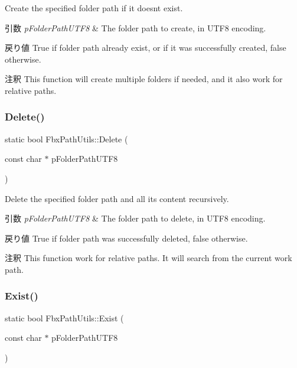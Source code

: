 Create the specified folder path if it doesn\textquotesingle{}t exist. 
\begin{DoxyParams}{引数}
{\em p\+Folder\+Path\+U\+T\+F8} & The folder path to create, in U\+T\+F8 encoding. \\
\hline
\end{DoxyParams}
\begin{DoxyReturn}{戻り値}
True if folder path already exist, or if it was successfully created, false otherwise. 
\end{DoxyReturn}
\begin{DoxyRemark}{注釈}
This function will create multiple folders if needed, and it also work for relative paths. 
\end{DoxyRemark}
\mbox{\label{class_fbx_path_utils_a7061a14d4a9f5dae1353d16d7155ee06}} 
\subsubsection{\texorpdfstring{Delete()}{Delete()}}
{\footnotesize\ttfamily static bool Fbx\+Path\+Utils\+::\+Delete (\begin{DoxyParamCaption}\item[{const char $\ast$}]{p\+Folder\+Path\+U\+T\+F8 }\end{DoxyParamCaption})\hspace{0.3cm}{\ttfamily [static]}}

Delete the specified folder path and all its content recursively. 
\begin{DoxyParams}{引数}
{\em p\+Folder\+Path\+U\+T\+F8} & The folder path to delete, in U\+T\+F8 encoding. \\
\hline
\end{DoxyParams}
\begin{DoxyReturn}{戻り値}
True if folder path was successfully deleted, false otherwise. 
\end{DoxyReturn}
\begin{DoxyRemark}{注釈}
This function work for relative paths. It will search from the current work path. 
\end{DoxyRemark}
\mbox{\label{class_fbx_path_utils_a5098828efd68614f77bc7bbe5f73f7cf}} 
\subsubsection{\texorpdfstring{Exist()}{Exist()}}
{\footnotesize\ttfamily static bool Fbx\+Path\+Utils\+::\+Exist (\begin{DoxyParamCaption}\item[{const char $\ast$}]{p\+Folder\+Path\+U\+T\+F8 }\end{DoxyParamCaption})\hspace{0.3cm}{\ttfamily [static]}}

